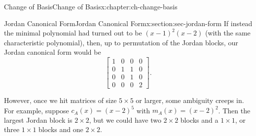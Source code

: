 \documentclass[oneside,10pt,]{book}
\numberwithin{equation}{section}
\providecommand\phantomsection{}
\newcommand{\bbm}{\begin{bmatrix}}
\newcommand{\ebm}{\end{bmatrix}}
\newcommand{\amp}{&}
\begin{document}
\begin{chapterptx}{Change of Basis}{}{Change of Basis}{}{}{x:chapter:ch-change-basis}
\begin{sectionptx}{Jordan Canonical Form}{}{Jordan Canonical Form}{}{}{x:section:sec-jordan-form}
If instead the minimal polynomial had turned out to be \((x-1)^2(x-2)\) (with the same characteristic polynomial), then, up to permutation of the Jordan blocks, our Jordan canonical form would be%
\begin{equation*}
\bbm 1\amp 0\amp 0\amp 0\\0\amp 1\amp 1\amp 0\\0\amp 0\amp 1\amp 0\\0\amp 0\amp 0\amp 2\ebm\text{.}
\end{equation*}
%
\par
However, once we hit matrices of size \(5\times 5\) or larger, some ambiguity creeps in. For example, suppose \(c_A(x) = (x-2)^5\) with \(m_A(x)=(x-2)^2\). Then the largest Jordan block is \(2\times 2\), but we could have two \(2\times 2\) blocks and a \(1\times 1\), or three \(1\times 1\) blocks and one \(2\times 2\).%
\end{sectionptx}
\end{chapterptx}
%
\appendix%
%
\clearpage\phantomsection%
%
%
%
\typeout{************************************************}
\typeout{************************************************}
%
\end{document}
